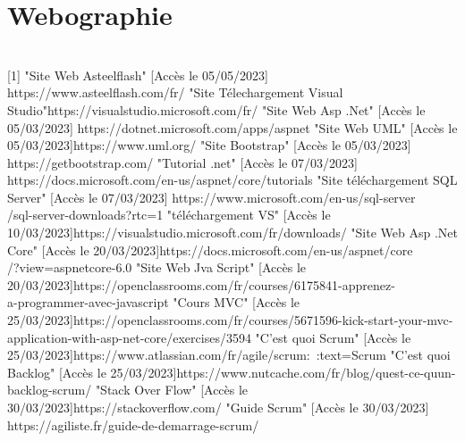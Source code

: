\chapter*{Webographie}

\\

[1] "Site Web Asteelflash" [Accès le 05/05/2023] \\ https://www.asteelflash.com/fr/ \newline
[2] "Site Télechargement Visual Studio"https://visualstudio.microsoft.com/fr/ \newline
[3] "Site Web Asp .Net" [Accès le 05/03/2023] https://dotnet.microsoft.com/apps/aspnet  \newline
[4] "Site Web UML" [Accès le 05/03/2023]https://www.uml.org/ \newline
[5] "Site Bootstrap" [Accès le 05/03/2023] https://getbootstrap.com/ \newline
[6] "Tutorial .net" [Accès le 07/03/2023] https://docs.microsoft.com/en-us/aspnet/core/tutorials  \newline
[7] "Site téléchargement SQL Server" [Accès le 07/03/2023] https://www.microsoft.com/en-us/sql-server\\/sql-server-downloads?rtc=1 \newline
[8] "téléchargement VS" [Accès le 10/03/2023]https://visualstudio.microsoft.com/fr/downloads/ \newline
[9] "Site Web Asp .Net Core" [Accès le 20/03/2023]https://docs.microsoft.com/en-us/aspnet/core\\/?view=aspnetcore-6.0 \newline
[10] "Site Web Jva Script" [Accès le 20/03/2023]https://openclassrooms.com/fr/courses/6175841-apprenez-\\a-programmer-avec-javascript  \newline
[11] "Cours MVC" [Accès le 25/03/2023]https://openclassrooms.com/fr/courses/5671596-kick-start-your-mvc-\\application-with-asp-net-core/exercises/3594 \newline
[12] "C'est quoi Scrum" [Accès le 25/03/2023]https://www.atlassian.com/fr/agile/scrum:~:text=Scrum \newline
[13] "C'est quoi Backlog" [Accès le 25/03/2023]https://www.nutcache.com/fr/blog/quest-ce-quun-backlog-scrum/  \newline
[14] "Stack Over Flow" [Accès le 30/03/2023]https://stackoverflow.com/ \newline
[15] "Guide Scrum" [Accès le 30/03/2023] https://agiliste.fr/guide-de-demarrage-scrum/ \newline
